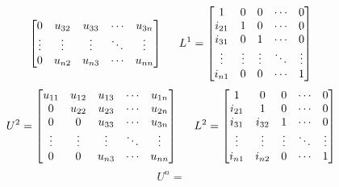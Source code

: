 \documentclass{article}
\begin{document}
\begin{enumerate}[noitemsep]
\[\begin{bmatrix}
                        0      & u_{32} & u_{33} & \cdots & u_{3n}\\
                        \vdots & \vdots & \vdots & \ddots & \vdots\\
                        0      & u_{n2} & u_{n3} & \cdots & u_{nn}
                    \end{bmatrix}\hspace{5mm}
                L^{1}=
                    \begin{bmatrix}
                        1      & 0      & 0      & \cdots & 0\\
                        i_{21} & 1      & 0      & \cdots & 0\\
                        i_{31} & 0      & 1      & \cdots & 0\\
                        \vdots & \vdots & \vdots & \ddots & \vdots\\
                        i_{n1} & 0      & 0      & \cdots & 1
                    \end{bmatrix}
                \]
                \[
                U^{2}=
                    \begin{bmatrix}
                        u_{11} & u_{12} & u_{13} & \cdots & u_{1n}\\
                        0      & u_{22} & u_{23} & \cdots & u_{2n}\\
                        0      & 0      & u_{33} & \cdots & u_{3n}\\
                        \vdots & \vdots & \vdots & \ddots & \vdots\\
                        0      & 0      & u_{n3} & \cdots & u_{nn}
                    \end{bmatrix}\hspace{5mm}
                L^{2}=
                    \begin{bmatrix}
                        1      & 0      & 0      & \cdots & 0\\
                        i_{21} & 1      & 0      & \cdots & 0\\
                        i_{31} & i_{32} & 1      & \cdots & 0\\
                        \vdots & \vdots & \vdots & \ddots & \vdots\\
                        i_{n1} & i_{n2} & 0      & \cdots & 1
                    \end{bmatrix}
                \]\vspace{5mm}
                \[
                \boxed{U^{n}=
}\]
\end{enumerate}
\end{document}
